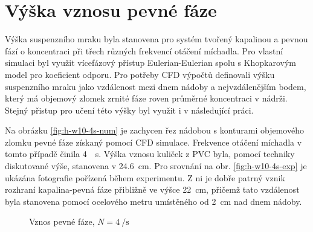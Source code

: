 \section{Výška vznosu pevné fáze}
Výška suspenzního mraku byla stanovena pro systém tvořený kapalinou \pvpS{} a pevnou fází o koncentraci  při třech různých frekvencí otáčení míchadla. Pro vlastní simulaci byl využit vícefázový přístup Eulerian-Eulerian spolu s Khopkarovým model pro koeficient odporu. Pro potřeby CFD výpočtů \citet{kas08} definovali výšku suspenzního mraku jako vzdálenost mezi dnem nádoby a nejvzdálenějším bodem, který má objemový zlomek zrnité fáze roven průměrné koncentraci v nádrži. Stejný přistup pro učení této výšky byl využit i v následující práci.  

Na obrázku \ref{fig:h-w10-4s-num} je zachycen řez nádobou s konturami objemového zlomku pevné fáze získaný pomocí CFD simulace. Frekvence otáčení míchadla v tomto případě činila \SI{4}{\per\second}. Výška vznosu kuliček z PVC byla, pomocí techniky diskutované výše, stanovena v \SI{24.6}{\centi\meter}. Pro srovnání na obr. \ref{fig:h-w10-4s-exp} je ukázána fotografie pořízená během experimentu. Z ni je dobře patrný vznik rozhraní kapalina-pevná fáze přibližně ve výšce \SI{22}{\centi\meter}, přičemž tato vzdálenost byla stanovena pomocí ocelového metru umístěného od \SI{2}{\centi\meter} nad dnem nádoby.

\begin{figure}[h!]
 \centering
  \qquad 
  \caption{Vznos pevné fáze, $N=\SI{4}{\per\second}$}
  \label{fig:h-w10-4s}
\end{figure}

